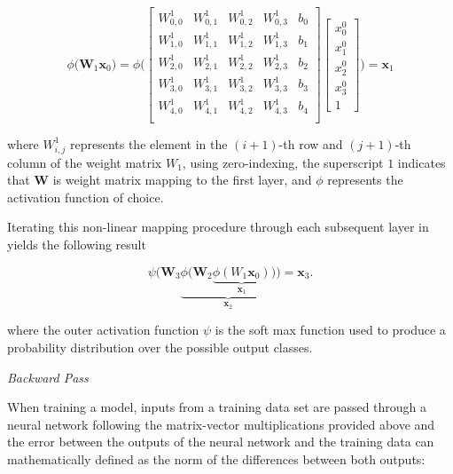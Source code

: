 \begin{equation}
    \phi\big(\boldsymbol{W}_1 \boldsymbol{x}_0 \big) = 
    \phi\bigg(
    \begin{bmatrix}
W_{0,0}^{1} & W_{0,1}^{1} & W_{0,2}^{1} & W_{0,3}^{1} & b_0\\
W_{1,0}^{1} & W_{1,1}^{1} & W_{1,2}^{1} & W_{1,3}^{1} & b_1\\
W_{2,0}^{1} & W_{2,1}^{1} & W_{2,2}^{1} & W_{2,3}^{1} & b_2\\
W_{3,0}^{1} & W_{3,1}^{1} & W_{3,2}^{1} & W_{3,3}^{1} & b_3\\
W_{4,0}^{1} & W_{4,1}^{1} & W_{4,2}^{1} & W_{4,3}^{1} & b_4\\
\end{bmatrix}
\begin{bmatrix}
    x_0^{0} \\
    x_1^{0} \\
    x_2^{0} \\
    x_3^{0} \\
    1
\end{bmatrix} 
\bigg)
= \boldsymbol{x}_1 
\end{equation}

where $W_{i,j}^{1}$ represents the element in the $(i+1)$-th row and $(j+1)$-th column of the weight matrix $W_1$, using zero-indexing, the superscript $1$ indicates that $\boldsymbol{W}$ is weight matrix mapping to the first layer, and $\phi$ represents the activation function of choice. 

Iterating this non-linear mapping procedure through each subsequent layer in  yields the following result 

\begin{equation}
    \psi\bigg(\boldsymbol{W}_3 
    \underbrace{\phi\big(\boldsymbol{W}_2 
    \underbrace{\phi(W_1 \boldsymbol{x}_0)}_{\boldsymbol{x}_1}
    \big)}_{\boldsymbol{x}_2}\bigg) = \boldsymbol{x}_3. 
\end{equation}

where the outer activation function $\psi$ is the soft max function used to produce a probability distribution over the possible output classes.


\vspace{0.5cm}
\noindent \textit{Backward Pass}
\vspace{0.25cm}

When training a model, inputs from a training data set are passed through a neural network following the matrix-vector multiplications provided above and the error between the outputs of the neural network and the training data can mathematically defined as the norm of the differences between both outputs: 

